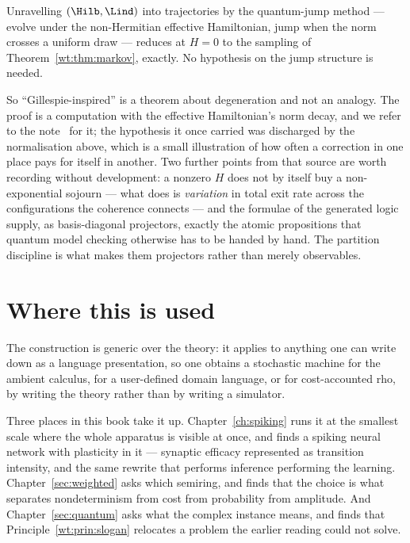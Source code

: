 \begin{theorem}[The Gillespie algorithm is the quantum jump at $H = 0$]
\label{wt:thm:degeneration}
Unravelling $(\Hilb,\Lind)$ into trajectories by the quantum-jump method --- evolve under
the non-Hermitian effective Hamiltonian, jump when the norm crosses a uniform draw ---
reduces at $H = 0$ to the sampling of Theorem~\ref{wt:thm:markov}, exactly. No hypothesis
on the jump structure is needed.
\end{theorem}

So ``Gillespie-inspired'' is a theorem about degeneration and not an analogy. The proof is
a computation with the effective Hamiltonian's norm decay, and we refer to the
note~\cite{StochSim} for it; the hypothesis it once carried was discharged by the
normalisation above, which is a small illustration of how often a correction in one place
pays for itself in another. Two further points from that source are worth recording without
development: a nonzero $H$ does not by itself buy a non-exponential sojourn --- what does is
\emph{variation} in total exit rate across the configurations the coherence connects --- and
the formulae of the generated logic supply, as basis-diagonal projectors, exactly the
atomic propositions that quantum model checking otherwise has to be handed by hand. The
partition discipline is what makes them projectors rather than merely observables.

\section{Where this is used}

The construction is generic over the theory: it applies to anything one can write down as
a language presentation, so one obtains a stochastic machine for the ambient calculus, for
a user-defined domain language, or for cost-accounted rho, by writing the theory rather
than by writing a simulator.

Three places in this book take it up. Chapter~\ref{ch:spiking} runs it at the smallest
scale where the whole apparatus is visible at once, and finds a spiking neural network
with plasticity in it --- synaptic efficacy represented as transition intensity, and the
same rewrite that performs inference performing the learning. Chapter~\ref{sec:weighted}
asks which semiring, and finds that the choice is what separates nondeterminism from cost
from probability from amplitude. And Chapter~\ref{sec:quantum} asks what the complex
instance means, and finds that Principle~\ref{wt:prin:slogan} relocates a problem the
earlier reading could not solve.

